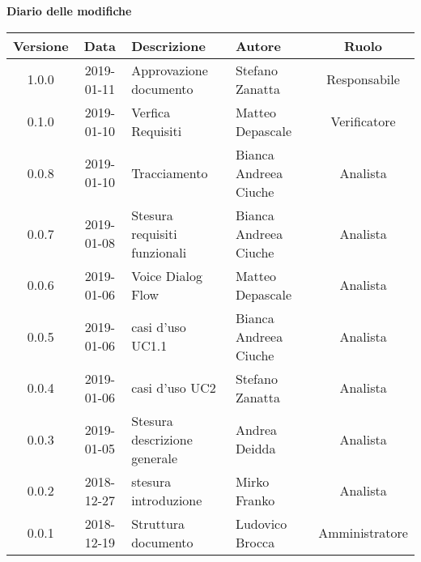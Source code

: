 	\begin{center}
		\textbf{Diario delle modifiche}
	\end{center}
	\begin{center}
		\begin{tabularx}{\textwidth}{|c|c|X|X|c|}
			\hline
			\textbf{Versione} & \textbf{Data} & \textbf{Descrizione} & \textbf{Autore} & \textbf{Ruolo} \\
			\hline
			1.0.0 & 2019-01-11 & Approvazione documento& Stefano Zanatta & Responsabile\\
			\hline
			0.1.0 & 2019-01-10 & Verfica Requisiti& Matteo Depascale & Verificatore\\
			\hline
			0.0.8 & 2019-01-10 &Tracciamento& Bianca Andreea Ciuche& Analista\\
			\hline
			0.0.7 & 2019-01-08 &Stesura requisiti funzionali& Bianca Andreea Ciuche& Analista\\
			\hline
			0.0.6 & 2019-01-06 & Voice Dialog Flow & Matteo Depascale & Analista\\
			\hline
			0.0.5 & 2019-01-06 & casi d'uso UC1.1& Bianca Andreea Ciuche & Analista\\
			\hline
			0.0.4 & 2019-01-06 & casi d'uso UC2& Stefano Zanatta & Analista\\
			\hline
			0.0.3 & 2019-01-05 & Stesura descrizione generale& Andrea Deidda & Analista\\
			\hline
			0.0.2 & 2018-12-27 & stesura introduzione & Mirko Franko & Analista\\
			\hline
			0.0.1 & 2018-12-19 & Struttura documento & Ludovico Brocca & Amministratore\\
			\hline
		\end{tabularx}
	\end{center}
\newpage